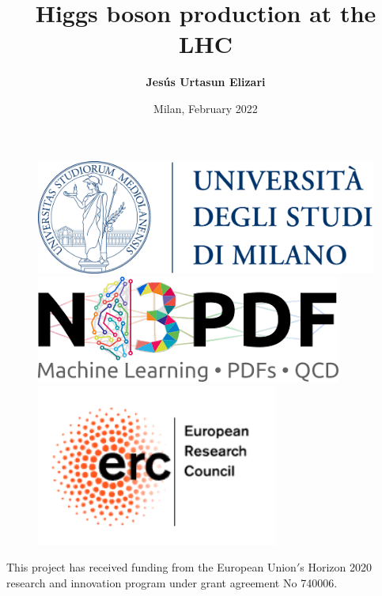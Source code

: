\documentclass[aspectratio=43]{beamer}
\title[Higgs boson production at the LHC]{Higgs boson production at the LHC}
\author{\textbf {Jes\'us Urtasun Elizari}}
\date{Milan, February 2022}
\begin{document}
\begin{frame}

	\vspace{1.0 cm}
	
	
	\vspace{0.25 cm}

	\begin{figure}
		\includegraphics[width = 3.0 cm]{plots/front_page/unimi.png}
		\hfill
		\includegraphics[width = 3.0 cm]{plots/front_page/n3pdf.png}
		\hfill
		\includegraphics[width = 3.0 cm]{plots/front_page/erc.png}
		\endminipage
	\end{figure}

	\vspace{1.0 cm}
	
	{\scriptsize \color{blue} This project has received funding from the European Union$'$s Horizon 2020 research and innovation program under grant agreement No 740006.}

\end{frame}
\end{document}
